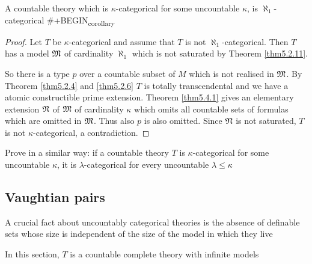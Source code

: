 \documentclass[11pt]{article}
\begin{document}
\begin{corollary}[]
\label{cor5.4.2}
A countable theory which is \(\kappa\)-categorical for some uncountable \(\kappa\), is \(\aleph_1\)-categorical
\#+BEGIN\textsubscript{corollary}
\end{corollary}

\begin{proof}
Let \(T\) be \(\kappa\)-categorical and assume that \(T\) is not \(\aleph_1\)-categorical. Then \(T\) has a
model \(\mathfrak{M}\) of cardinality \(\aleph_1\) which is not saturated by Theorem \ref{thm5.2.11}.
\begin{center}\end{center}
So there is a type \(p\) over a countable subset of \(M\) which is not realised in \(\mathfrak{M}\). By
Theorem \ref{thm5.2.4} and \ref{thm5.2.6} \(T\) is totally transcendental and we have a atomic
constructible prime extension. Theorem \ref{thm5.4.1}
gives an elementary extension \(\mathfrak{N}\) of \(\mathfrak{M}\) of cardinality \(\kappa\) which omits all countable sets of
formulas which are omitted in \(\mathfrak{M}\). Thus also \(p\) is also omitted. Since \(\mathfrak{N}\) is not
saturated, \(T\) is not \(\kappa\)-categorical, a contradiction.
\end{proof}

\begin{exercise}
\label{ex5.4.1}
Prove in a similar way: if a countable theory \(T\) is \(\kappa\)-categorical for some uncountable \(\kappa\), it
is \(\lambda\)-categorical for every uncountable \(\lambda\le\kappa\)
\end{exercise}

\subsection{Vaughtian pairs}
\label{sec:org089bb98}
A crucial fact about uncountably categorical theories is the absence of definable sets whose
size is independent of the size of the model in which they live

In this section, \(T\) is a countable complete theory with infinite models

\begin{center}\end{center}
\end{document}

